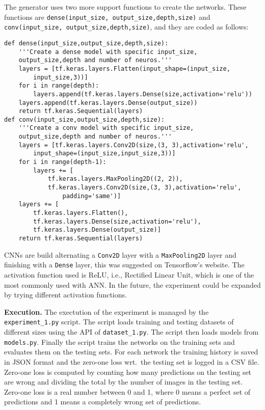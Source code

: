 The generator uses two more support functions to create the networks. These functions are \texttt{dense(input\_size, output\_size,depth,size)} and \texttt{conv(input\_size, output\_size,depth,size)}, and they are coded as follows:
\begin{verbatim}
def dense(input_size,output_size,depth,size):
    '''Create a dense model with specific input_size,
    output_size,depth and number of neuros.'''
    layers = [tf.keras.layers.Flatten(input_shape=(input_size,
        input_size,3))]
    for i in range(depth):
        layers.append(tf.keras.layers.Dense(size,activation='relu'))
    layers.append(tf.keras.layers.Dense(output_size))
    return tf.keras.Sequential(layers)
def conv(input_size,output_size,depth,size):
    '''Create a conv model with specific input_size,
    output_size,depth and number of neuros.'''
    layers = [tf.keras.layers.Conv2D(size,(3, 3),activation='relu',
        input_shape=(input_size,input_size,3))]
    for i in range(depth-1):
        layers += [
            tf.keras.layers.MaxPooling2D((2, 2)),
            tf.keras.layers.Conv2D(size,(3, 3),activation='relu',
                padding='same')]
    layers += [
        tf.keras.layers.Flatten(),
        tf.keras.layers.Dense(size,activation='relu'),
        tf.keras.layers.Dense(output_size)]
    return tf.keras.Sequential(layers)
\end{verbatim}
CNNs are build alternating a \texttt{Conv2D} layer with a \texttt{MaxPooling2D} layer and finishing with a \texttt{Dense} layer, this was suggested on Tensorflow's website. The activation function used is ReLU, i.e., Rectified Linear Unit, which is one of the most commonly used with ANN. In the future, the experiment could be expanded by trying different activation functions.

\textbf{Execution.}
The exectution of the experiment is managed by the \texttt{experiment\_1.py} script. The script loads training and testing datasets of different sizes using the API of \texttt{dataset\_1.py}. The script then loads models from \texttt{models.py}. Finally the script trains the networks on the training sets and evaluates them on the testing sets. For each network the training history is saved in JSON format and the zero-one loss wrt.~the testing set is logged in a CSV file. Zero-one loss is computed by counting how many predictions on the testing set are wrong and dividing the total by the number of images in the testing set. Zero-one loss is a real number between 0 and 1, where 0 means a perfect set of predictions and 1 means a completely wrong set of predictions.

